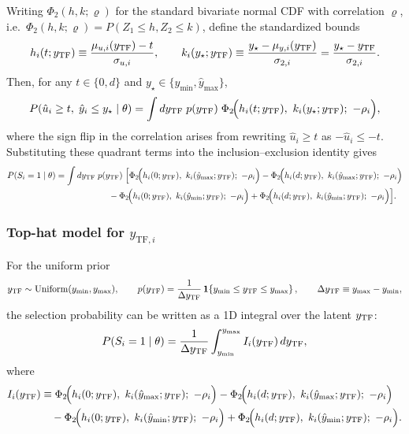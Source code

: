 Writing $\Phi_2(h,k;\varrho)$ for the standard bivariate normal CDF with
correlation $\varrho$, i.e.\ $\Phi_2(h,k;\varrho)=P(Z_1\le h, Z_2\le k)$, define
the standardized bounds
\begin{equation}
h_i(t;y_{\rm TF}) \equiv \frac{\mu_{u,i}(y_{\rm TF})-t}{\sigma_{u,i}},
\qquad
k_i(y_\star;y_{\rm TF}) \equiv \frac{y_\star-\mu_{y,i}(y_{\rm TF})}{\sigma_{2,i}}
= \frac{y_\star-y_{\rm TF}}{\sigma_{2,i}}.
\end{equation}
Then, for any $t\in\{0,d\}$ and $y_\star\in\{\hat y_{\min},\hat y_{\max}\}$,
\begin{equation}
P(\hat u_i\ge t,\;\hat y_i\le y_\star\mid \theta)
=
\int dy_{\rm TF}\;p(y_{\rm TF})\;
\Phi_2\!\Bigl(h_i(t;y_{\rm TF}),\ k_i(y_\star;y_{\rm TF});\ -\rho_i\Bigr),
\end{equation}
where the sign flip in the correlation arises from rewriting
$\hat u_i\ge t$ as $-\hat u_i\le -t$.
Substituting these quadrant terms into the inclusion--exclusion identity gives
\begin{equation}
\begin{aligned}
P(S_i=1 \mid \theta)
&=
\int dy_{\rm TF}\;p(y_{\rm TF})\;\Big[
\Phi_2\!\Bigl(h_i(0;y_{\rm TF}),\ k_i(\hat y_{\max};y_{\rm TF});\ -\rho_i\Bigr)
-\Phi_2\!\Bigl(h_i(d;y_{\rm TF}),\ k_i(\hat y_{\max};y_{\rm TF});\ -\rho_i\Bigr)\\
&\hspace{62pt}
-\Phi_2\!\Bigl(h_i(0;y_{\rm TF}),\ k_i(\hat y_{\min};y_{\rm TF});\ -\rho_i\Bigr)
+\Phi_2\!\Bigl(h_i(d;y_{\rm TF}),\ k_i(\hat y_{\min};y_{\rm TF});\ -\rho_i\Bigr)
\Big].
\end{aligned}
\end{equation}

\subsubsection{Top-hat model for $y_{\mathrm{TF},i}$}
For the uniform prior
\[
y_{\rm TF}\sim \mathrm{Uniform}(y_{\min},y_{\max}),
\qquad
p(y_{\rm TF})=\frac{1}{\Delta y_{\rm TF}}\,
\mathbf 1\!\left\{y_{\min}\le y_{\rm TF}\le y_{\max}\right\},
\qquad
\Delta y_{\rm TF}\equiv y_{\max}-y_{\min},
\]
the selection probability can be written as a 1D integral over the latent
$y_{\rm TF}$:
\begin{equation}
P(S_i=1\mid\theta)
=\frac{1}{\Delta y_{\rm TF}}\int_{y_{\min}}^{y_{\max}}
I_i(y_{\rm TF})\,dy_{\rm TF},
\end{equation}
where
\begin{equation}
\label{eq:Ii_def}
\begin{aligned}
I_i(y_{\rm TF})
&\equiv
\Phi_2\!\Bigl(h_i(0;y_{\rm TF}),\ k_i(\hat y_{\max};y_{\rm TF});\ -\rho_i\Bigr)
-\Phi_2\!\Bigl(h_i(d;y_{\rm TF}),\ k_i(\hat y_{\max};y_{\rm TF});\ -\rho_i\Bigr)\\
&\quad
-\Phi_2\!\Bigl(h_i(0;y_{\rm TF}),\ k_i(\hat y_{\min};y_{\rm TF});\ -\rho_i\Bigr)
+\Phi_2\!\Bigl(h_i(d;y_{\rm TF}),\ k_i(\hat y_{\min};y_{\rm TF});\ -\rho_i\Bigr).
\end{aligned}
\end{equation}

